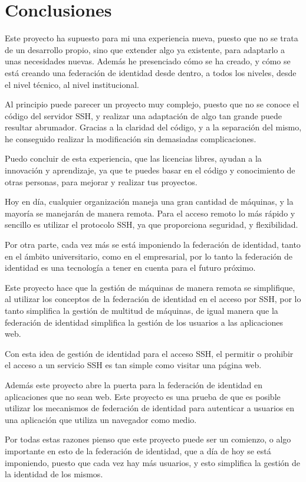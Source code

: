 \chapter{Conclusiones}

Este proyecto ha supuesto para mi una experiencia nueva, puesto que no se
trata de un desarrollo propio, sino que extender algo ya existente, para
adaptarlo a unas necesidades nuevas. Además he presenciado cómo se ha
creado, y cómo se está creando una federación de identidad desde dentro, a
todos los niveles, desde el nivel técnico, al nivel institucional.

Al principio puede parecer un proyecto muy complejo, puesto que no se
conoce el código del servidor SSH, y realizar una adaptación de algo tan
grande puede resultar abrumador. Gracias a la claridad del código, y a la
separación del mismo, he conseguido realizar la modificación sin demasiadas
complicaciones.

Puedo concluir de esta experiencia, que las licencias libres, ayudan a la
innovación y aprendizaje, ya que te puedes basar en el código y
conocimiento de otras personas, para mejorar y realizar tus proyectos.

Hoy en día, cualquier organización maneja una gran cantidad de máquinas, y
la mayoría se manejarán de manera remota. Para el acceso remoto lo más
rápido y sencillo es utilizar el protocolo SSH, ya que proporciona
seguridad, y flexibilidad.

Por otra parte, cada vez más se está imponiendo la federación de identidad,
tanto en el ámbito universitario, como en el empresarial, por lo tanto la
federación de identidad es una tecnología a tener en cuenta para el futuro
próximo.

Este proyecto hace que la gestión de máquinas de manera remota se
simplifique, al utilizar los conceptos de la federación de identidad en el
acceso por SSH, por lo tanto simplifica la gestión de multitud de máquinas,
de igual manera que la federación de identidad simplifica la gestión de los
usuarios a las aplicaciones web.

Con esta idea de gestión de identidad para el acceso SSH, el permitir o
prohibir el acceso a un servicio SSH es tan simple como visitar una página
web.

Además este proyecto abre la puerta para la federación de identidad en
aplicaciones que no sean web. Este proyecto es una prueba de que es posible
utilizar los mecanismos de federación de identidad para autenticar a
usuarios en una aplicación que utiliza un navegador como medio.

Por todas estas razones pienso que este proyecto puede ser un comienzo, o
algo importante en esto de la federación de identidad, que a día de hoy se
está imponiendo, puesto que cada vez hay más usuarios, y esto simplifica la
gestión de la identidad de los mismos.
